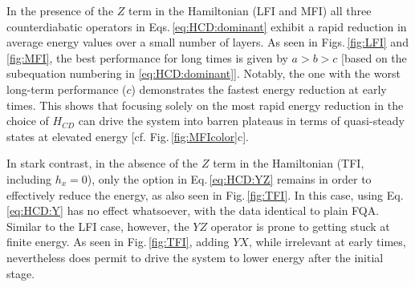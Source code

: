 \documentclass[twocolumn,aps,superscriptaddress,floatfix,longbibliography]{revtex4-2}
\newcommand{\Eq}[1]{Eq.\,\eqref{#1}}
\newcommand{\Eqs}[1]{Eqs.\,\eqref{#1}}
\newcommand{\Fig}[1]{Fig.\,\ref{fig:#1}}
\newcommand{\Figs}[1]{Figs.\,\ref{fig:#1}}
\def\YX{\ensuremath{\mathit{YX}}\xspace} %
\def\XY{\ensuremath{\mathit{XY}}\xspace}
\def\YZ{\ensuremath{\mathit{YZ}}\xspace}
\def\XZ{\ensuremath{\mathit{XZ}}\xspace}
\def\ZX{\ensuremath{\mathit{ZX}}\xspace}
\def\XX{\ensuremath{\mathit{XX}}\xspace}
\def\YY{\ensuremath{\mathit{YY}}\xspace}
\def\ZZ{\ensuremath{\mathit{ZZ}}\xspace}
\begin{document}

In the presence of the $Z$ term in the Hamiltonian
(LFI and MFI) %
all three counterdiabatic operators in \Eqs{eq:HCD:dominant}
exhibit a rapid reduction in average energy values over a small
number of layers.
As seen in \Figs{LFI} and \ref{fig:MFI},
the best performance for long times is given by $a>b>c$
[based on the subequation numbering in \eqref{eq:HCD:dominant}].
Notably, the one with the worst long-term performance ($c$) 
demonstrates the fastest energy reduction at early times.
This shows that focusing solely on the most rapid energy reduction in the choice of $H_{CD}$
can drive the system into barren plateaus in terms of quasi-steady
states at elevated energy [cf. \Fig{MFIcolor}c].


In stark contrast, in %
the absence of the $Z$ term in the Hamiltonian (TFI,
 including $h_x=0$), only the option in \Eq{eq:HCD:YZ} remains in order to effectively reduce the energy, as also seen in \Fig{TFI}. 
In this case, using \Eq{eq:HCD:Y} has no effect
whatsoever, with the data identical to plain FQA.
Similar to the LFI case, however, the \YZ operator
is prone to getting stuck at finite energy.
As seen in \Fig{TFI},
adding \YX, while irrelevant at early times,
nevertheless does permit to drive the system to
lower energy after the initial stage. 
\end{document}
